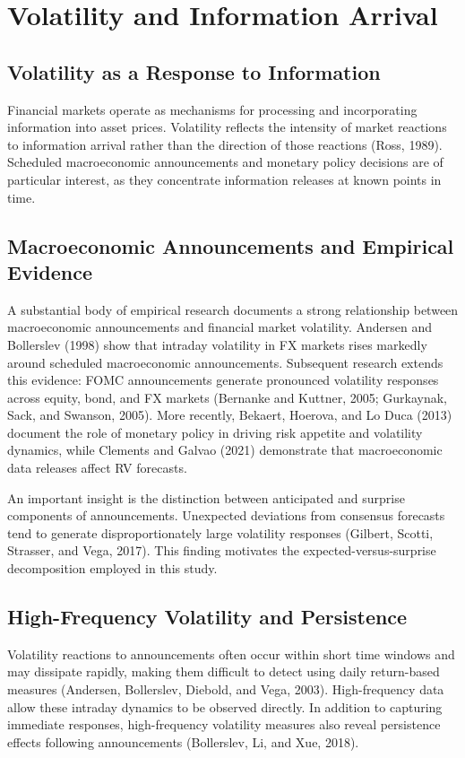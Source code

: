 \documentclass[12pt,a4paper]{report}
\begin{document}
\section{Volatility and Information Arrival}
\subsection{Volatility as a Response to Information}
Financial markets operate as mechanisms for processing and incorporating information into asset prices. Volatility reflects the intensity of market reactions to information arrival rather than the direction of those reactions (Ross, 1989). Scheduled macroeconomic announcements and monetary policy decisions are of particular interest, as they concentrate information releases at known points in time.

\subsection{Macroeconomic Announcements and Empirical Evidence}
A substantial body of empirical research documents a strong relationship between macroeconomic announcements and financial market volatility. Andersen and Bollerslev (1998) show that intraday volatility in FX markets rises markedly around scheduled macroeconomic announcements. Subsequent research extends this evidence: FOMC announcements generate pronounced volatility responses across equity, bond, and FX markets (Bernanke and Kuttner, 2005; Gurkaynak, Sack, and Swanson, 2005). More recently, Bekaert, Hoerova, and Lo Duca (2013) document the role of monetary policy in driving risk appetite and volatility dynamics, while Clements and Galvao (2021) demonstrate that macroeconomic data releases affect RV forecasts.

An important insight is the distinction between anticipated and surprise components of announcements. Unexpected deviations from consensus forecasts tend to generate disproportionately large volatility responses (Gilbert, Scotti, Strasser, and Vega, 2017). This finding motivates the expected-versus-surprise decomposition employed in this study.

\subsection{High-Frequency Volatility and Persistence}
Volatility reactions to announcements often occur within short time windows and may dissipate rapidly, making them difficult to detect using daily return-based measures (Andersen, Bollerslev, Diebold, and Vega, 2003). High-frequency data allow these intraday dynamics to be observed directly. In addition to capturing immediate responses, high-frequency volatility measures also reveal persistence effects following announcements (Bollerslev, Li, and Xue, 2018).
\end{document}
